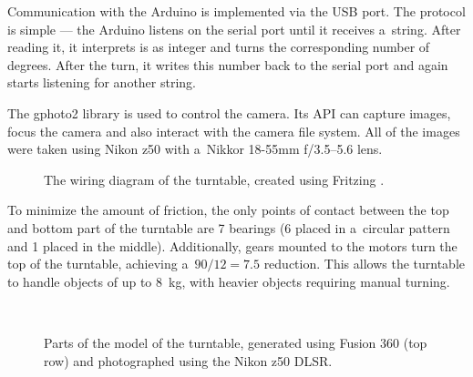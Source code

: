 Communication with the Arduino is implemented via the USB port.
The protocol is simple --- the Arduino listens on the serial port until it receives a~string.
After reading it, it interprets is as integer and turns the corresponding number of degrees.
After the turn, it writes this number back to the serial port and again starts listening for another string.

The gphoto2 \cite{gphoto2} library is used to control the camera.
Its API can capture images, focus the camera and also interact with the camera file system.
All of the images were taken using Nikon z50 with a~Nikkor 18-55mm f/3.5--5.6 lens.

\begin{figure}
	\centering
	
	\caption{The wiring diagram of the turntable, created using Fritzing \cite{fritzing}.}
	\label{fig:wiring}
\end{figure}

To minimize the amount of friction, the only points of contact between the top and bottom part of the turntable are 7 bearings (6 placed in a~circular pattern and 1 placed in the middle).
Additionally, gears mounted to the motors turn the top of the turntable, achieving a~$90/12 = 7.5$ reduction.
This allows the turntable to handle objects of up to \SI{8}{\kilo\gram}, with heavier objects requiring manual turning.

\begin{figure}[t]
	\centering
	\hfill
	\hfill
	\\
	\hfill
	\hfill
	\hspace{1.2em}
	\caption{Parts of the model of the turntable, generated using Fusion 360 (top row) and photographed using the Nikon z50 DLSR. }%
	\label{fig:turntable}
\end{figure}

